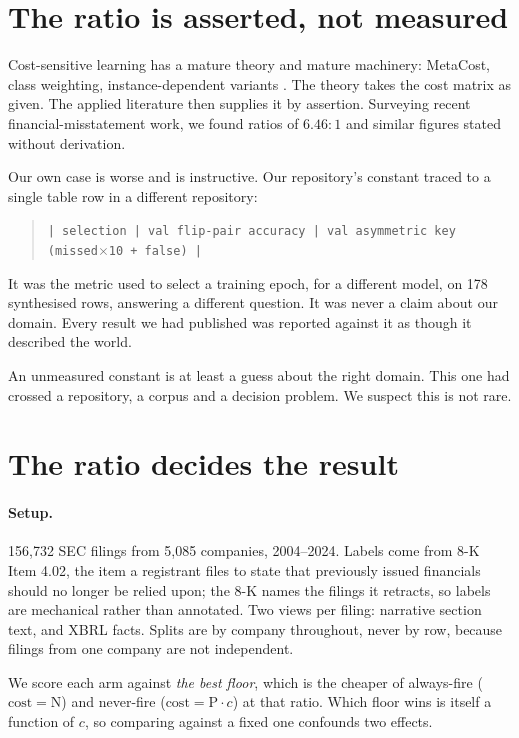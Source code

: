 \documentclass[11pt]{article}
\begin{document}
\section{The ratio is asserted, not measured}
\label{sec:asserted}

Cost-sensitive learning has a mature theory \citep{elkan2001,provost2001} and mature machinery:
MetaCost, class weighting, instance-dependent variants \citep{bahnsen2014}. The theory takes
the cost matrix as given. The applied literature then supplies it by assertion. Surveying
recent financial-misstatement work, we found ratios of $6.46{:}1$ and similar figures stated
without derivation.

Our own case is worse and is instructive. Our repository's constant traced to a single table
row in a different repository:

\begin{quote}\small
\texttt{| selection | val flip-pair accuracy | val asymmetric key (missed$\times$10 + false) |}
\end{quote}

It was the metric used to select a training epoch, for a different model, on 178 synthesised
rows, answering a different question. It was never a claim about our domain. Every result we
had published was reported against it as though it described the world.

An unmeasured constant is at least a guess about the right domain. This one had crossed a
repository, a corpus and a decision problem. We suspect this is not rare.

\section{The ratio decides the result}
\label{sec:sweep}

\paragraph{Setup.} 156{,}732 SEC filings from 5{,}085 companies, 2004--2024. Labels come from
8-K Item 4.02, the item a registrant files to state that previously issued financials should no
longer be relied upon; the 8-K names the filings it retracts, so labels are mechanical rather
than annotated. Two views per filing: narrative section text, and XBRL facts. Splits are by
company throughout, never by row, because filings from one company are not independent.

We score each arm against \emph{the best floor}, which is the cheaper of always-fire
($\text{cost} = \mathrm{N}$) and never-fire ($\text{cost} = \mathrm{P}\cdot c$) at that ratio.
Which floor wins is itself a function of $c$, so comparing against a fixed one confounds two
effects.
\end{document}
